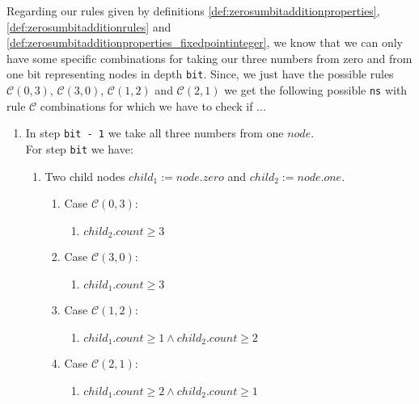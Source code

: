 Regarding our rules given by definitions \ref{def:zerosumbitadditionproperties}, \ref{def:zerosumbitadditionrules} and \ref{def:zerosumbitadditionproperties_fixedpointinteger}, we know that we can only have some specific combinations for taking our three numbers from zero and from one bit representing nodes in depth \texttt{bit}. Since, we just have the possible rules $\mathcal{C}\left(0,3\right)$, $\mathcal{C}\left(3,0\right)$, $\mathcal{C}\left(1,2\right)$ and $\mathcal{C}\left(2,1\right)$ we get the following possible \texttt{ns} with rule $\mathcal{C}$ combinations for which we have to check if ...

\begin{enumerate}

    \item In step \texttt{bit - 1} we take all three numbers from one $node$.\\
        For step \texttt{bit} we have:        
        \begin{enumerate}
            \item Two child nodes $child_{1} := node.zero$ and $child_{2} := node.one$.
            
            \begin{enumerate}
                \item Case $\mathcal{C}\left(0,3\right)$:
                    \begin{enumerate}
                        \item $child_{2}.count \geq 3$
                    \end{enumerate}
                \item Case $\mathcal{C}\left(3,0\right)$:
                    \begin{enumerate}
                        \item $child_{1}.count \geq 3$
                    \end{enumerate}

                \item Case $\mathcal{C}\left(1,2\right)$:
                    \begin{enumerate}
                        \item $child_{1}.count \geq 1 \wedge child_{2}.count \geq 2$
                    \end{enumerate}
                \item Case $\mathcal{C}\left(2,1\right)$:
                    \begin{enumerate}
                        \item $child_{1}.count \geq 2 \wedge child_{2}.count \geq 1$
                    \end{enumerate}
            \end{enumerate}
        \end{enumerate}


\end{enumerate}
